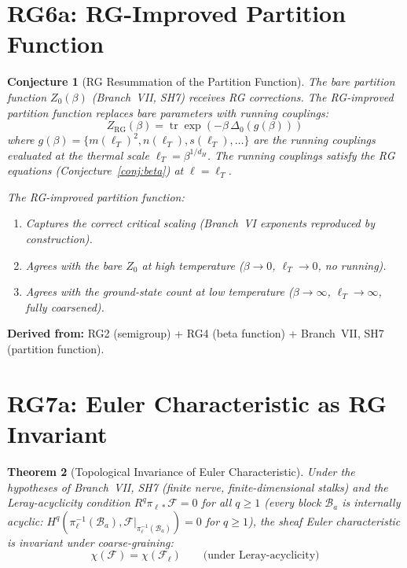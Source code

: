 \documentclass[11pt,letterpaper]{article}
\newtheorem{conjecture}{Conjecture}[section]
\newtheorem{theorem}[conjecture]{Theorem}
\newcommand{\tr}{\operatorname{tr}}
\newcommand{\sheaf}{\mathcal{F}}
\newcommand{\block}{\mathcal{B}}
\begin{document}
\section{RG6a: RG-Improved Partition Function}

\begin{conjecture}[RG Resummation of the Partition 
Function]\label{conj:rg_partition}
The bare partition function $Z_0(\beta)$ (Branch~VII, SH7) 
receives RG corrections. The \emph{RG-improved partition function} 
replaces bare parameters with running couplings:
\begin{equation}\label{eq:rg_partition}
    Z_{\mathrm{RG}}(\beta) = \tr \exp(-\beta \, 
    \Delta_0(g(\beta)))
\end{equation}
where $g(\beta) = \{m(\ell_T)^2, n(\ell_T), s(\ell_T), \ldots\}$ 
are the running couplings evaluated at the \emph{thermal scale} 
$\ell_T = \beta^{1/d_H}$. The running couplings satisfy the RG 
equations (Conjecture~\ref{conj:beta}) at $\ell = \ell_T$.

The RG-improved partition function:
\begin{enumerate}[label=(\alph*)]
    \item Captures the correct critical scaling (Branch~VI exponents 
    reproduced by construction).
    \item Agrees with the bare $Z_0$ at high temperature 
    ($\beta \to 0$, $\ell_T \to 0$, no running).
    \item Agrees with the ground-state count at low temperature 
    ($\beta \to \infty$, $\ell_T \to \infty$, fully coarsened).
\end{enumerate}
\end{conjecture}

\textbf{Derived from:} RG2 (semigroup) + RG4 (beta function) + 
Branch~VII, SH7 (partition function).

\section{RG7a: Euler Characteristic as RG Invariant}

\begin{theorem}[Topological Invariance of Euler 
Characteristic]\label{thm:euler_invariant}
Under the hypotheses of Branch~VII, SH7 (finite nerve, 
finite-dimensional stalks) and the \emph{Leray-acyclicity 
condition} $R^q \pi_{\ell *} \sheaf = 0$ for all $q \geq 1$ 
(every block $\block_a$ is internally acyclic: 
$H^q(\pi_\ell^{-1}(\block_a), \sheaf|_{\pi_\ell^{-1}(\block_a)}) 
= 0$ for $q \geq 1$), the sheaf Euler characteristic is invariant 
under coarse-graining:
\begin{equation}\label{eq:euler_invariant}
    \chi(\sheaf) = \chi(\sheaf_\ell) \qquad 
    \text{(under Leray-acyclicity)}
\end{equation}
\end{theorem}
\end{document}
